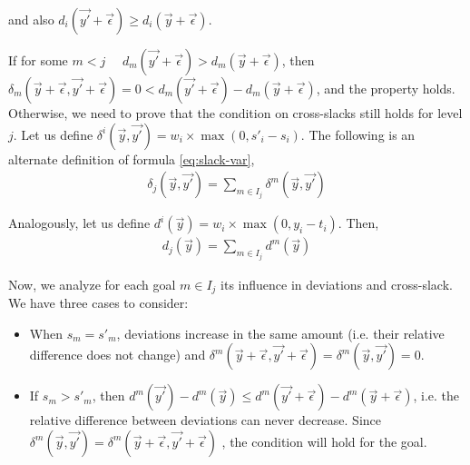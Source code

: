 \begin{demo}
\noindent and also $d_i(\vec {y'} + \vec{\epsilon}) \geq d_i(\vec {y}+ \vec{\epsilon})$. 

If for some $m < j$ \ \ $d_m(\vec {y'} + \vec{\epsilon}) > d_m(\vec {y}+ \vec{\epsilon})$, then $\delta_m(\vec y + \vec{\epsilon}, \vec{y'}+ \vec{\epsilon}) = 0 < d_m(\vec {y'} + \vec{\epsilon}) - d_m(\vec {y}+ \vec{\epsilon})$, and the property holds. Otherwise, we need to prove that the condition on cross-slacks still holds for level $j$. Let us define $\delta^i(\vec{y}, \vec{y'}) = w_i \times \max(0, s'_i - s_i)$. The following is an alternate definition of formula \ref{eq:slack-var},
\begin{align*}
    \delta_j(\vec{y}, \vec{y'}) = \sum_{m\in I_j} \delta^m(\vec{y}, \vec{y'})
 \end{align*}
	
Analogously, let us define $d^i(\vec{y}) = w_i \times \max(0, y_i - t_i)$. Then,
\begin{align*}
    d_j(\vec{y}) = \sum_{m\in I_j} d^m(\vec{y})
\end{align*}
	
Now, we analyze for each goal $m \in I_j$ its influence in deviations and cross-slack. We have three cases to consider:

\begin{itemize}
	\item When $s_m = s'_m$, deviations increase in the same amount (i.e. their relative difference does not change) and $\delta^m(\vec{y}+ \vec{\epsilon}, \vec{y'}+ \vec{\epsilon}) = \delta^m(\vec{y}, \vec{y'}) = 0$.

	\item If $s_m > s'_m$, then $d^m(\vec{y'}) - d^m(\vec{y}) \leq d^m(\vec{y'} + \vec \epsilon) - d^m(\vec{y} + \vec \epsilon)$, i.e. the relative difference between deviations can never decrease. Since $\delta^m(\vec{y}, \vec{y'}) = \delta^m(\vec{y}+ \vec{\epsilon}, \vec{y'}+ \vec{\epsilon})$ , the condition will hold for the goal.


\end{itemize}
\end{demo}
